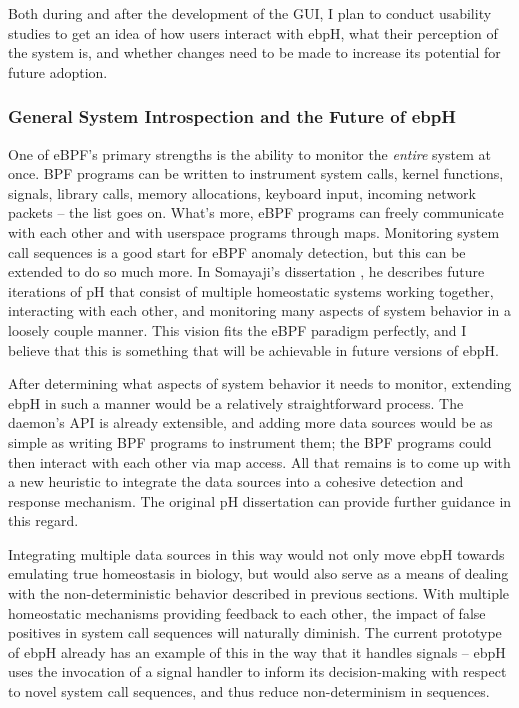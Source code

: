 \documentclass[
  12pt]{findlay}
\begin{document}
Both during and after the development of the GUI, I plan to conduct
usability studies to get an idea of how users interact with ebpH, what
their perception of the system is, and whether changes need to be made
to increase its potential for future adoption.

\hypertarget{general-system-introspection-and-the-future-of-ebph}{%
\subsubsection{General System Introspection and the Future of
ebpH}\label{general-system-introspection-and-the-future-of-ebph}}

\label{general_introspection}

One of eBPF's primary strengths is the ability to monitor the
\emph{entire} system at once. BPF programs can be written to instrument
system calls, kernel functions, signals, library calls, memory
allocations, keyboard input, incoming network packets -- the list goes
on. What's more, eBPF programs can freely communicate with each other
and with userspace programs through maps. Monitoring system call
sequences is a good start for eBPF anomaly detection, but this can be
extended to do so much more. In Somayaji's dissertation
\autocite{soma02}, he describes future iterations of pH that consist of
multiple homeostatic systems working together, interacting with each
other, and monitoring many aspects of system behavior in a loosely
couple manner. This vision fits the eBPF paradigm perfectly, and I
believe that this is something that will be achievable in future
versions of ebpH.

After determining what aspects of system behavior it needs to monitor,
extending ebpH in such a manner would be a relatively straightforward
process. The daemon's API is already extensible, and adding more data
sources would be as simple as writing BPF programs to instrument them;
the BPF programs could then interact with each other via map access. All
that remains is to come up with a new heuristic to integrate the data
sources into a cohesive detection and response mechanism. The original
pH dissertation \autocite{soma02} can provide further guidance in this
regard.

Integrating multiple data sources in this way would not only move ebpH
towards emulating true homeostasis in biology, but would also serve as a
means of dealing with the non-deterministic behavior described in
previous sections. With multiple homeostatic mechanisms providing
feedback to each other, the impact of false positives in system call
sequences will naturally diminish. The current prototype of ebpH already
has an example of this in the way that it handles signals -- ebpH uses
the invocation of a signal handler to inform its decision-making with
respect to novel system call sequences, and thus reduce non-determinism
in sequences.
\end{document}
